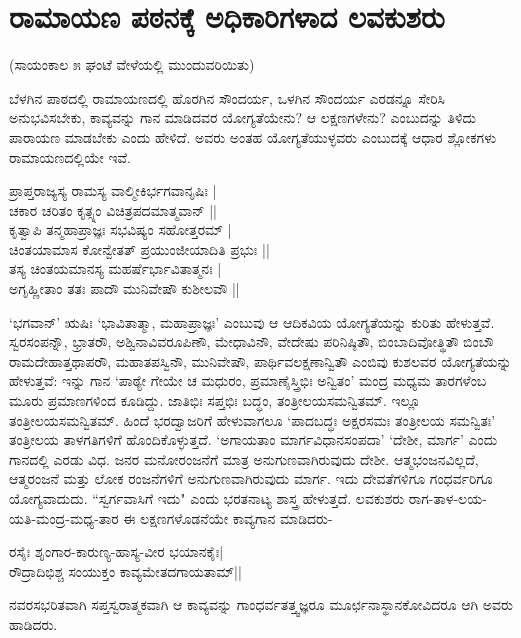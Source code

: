 \section*{ರಾಮಾಯಣ ಪಠನಕ್ಕೆ ಅಧಿಕಾರಿಗಳಾದ ಲವಕುಶರು} 

\begin{center} 
(ಸಾಯಂಕಾಲ ೫ ಘಂಟೆ ವೇಳೆಯಲ್ಲಿ ಮುಂದುವರಿಯಿತು) 
\end{center} 


ಬೆಳಗಿನ ಪಾಠದಲ್ಲಿ ರಾಮಾಯಣದಲ್ಲಿ ಹೊರಗಿನ ಸೌಂದರ್ಯ, ಒಳಗಿನ ಸೌಂದರ್ಯ ಎರಡನ್ನೂ ಸೇರಿಸಿ ಅನುಭವಿಸಬೇಕು, ಕಾವ್ಯವನ್ನು ಗಾನ ಮಾಡಿದವರ ಯೋಗ್ಯತೆಯೇನು? ಆ ಲಕ್ಷಣಗಳೇನು? ಎಂಬುದನ್ನು ತಿಳಿದು ಪಾರಾಯಣ ಮಾಡಬೇಕು ಎಂದು ಹೇಳಿದೆ. ಅವರು ಅಂತಹ ಯೋಗ್ಯತೆಯುಳ್ಳವರು ಎಂಬುದಕ್ಕೆ ಆಧಾರ ಶ್ಲೋಕಗಳು ರಾಮಾಯಣದಲ್ಲಿಯೇ ಇವೆ. 


\begin{shloka}
ಪ್ರಾಪ್ತರಾಜ್ಯಸ್ಯ ರಾಮಸ್ಯ ವಾಲ್ಮೀಕಿರ್ಭಗವಾನೃಷಿಃ |\\ 
ಚಕಾರ ಚರಿತಂ ಕೃತ್ಸ್ನಂ ವಿಚಿತ್ರಪದಮಾತ್ಮವಾನ್‍ ||\\ 
ಕೃತ್ವಾಪಿ ತನ್ಮಹಾಪ್ರಾಜ್ಞಃ ಸಭವಿಷ್ಯಂ ಸಹೋತ್ತರಮ್‍ |\\ 
ಚಿಂತಯಾಮಾಸ ಕೋನ್ವೇತತ್‍ ಪ್ರಯುಂಜೀಯಾದಿತಿ ಪ್ರಭುಃ ||\\ 
ತಸ್ಯ ಚಿಂತಯಮಾನಸ್ಯ ಮಹರ್ಷೆರ್ಭಾವಿತಾತ್ಮನಃ |\\ 
ಅಗೃಹ್ಣೀತಾಂ ತತಃ ಪಾದೌ ಮುನಿವೇಷೌ ಕುಶೀಲವೌ ||
\end{shloka}

`ಭಗವಾನ್‍' ಋಷಿಃ `ಭಾವಿತಾತ್ಮಾ, ಮಹಾಪ್ರಾಜ್ಞಃ' ಎಂಬುವು ಆ ಆದಿಕವಿಯ ಯೋಗ್ಯತೆಯನ್ನು ಕುರಿತು ಹೇಳುತ್ತವೆ. ಸ್ವರಸಂಪನ್ನೌ, ಭ್ರಾತರೌ, ಅಶ್ವಿನಾವಿವರೂಪಿಣೌ, ಮೇಧಾವಿನೌ, ವೇದೇಷು ಪರಿನಿಷ್ಠಿತೌ, ಬಿಂಬಾದಿವೋತ್ಥಿತೌ ಬಿಂಬೌ ರಾಮದೇಹಾತ್ತಥಾಪರೌ, ಮಹಾತಪಸ್ವಿನೌ, ಮುನಿವೇಷೌ, ಪಾರ್ಥಿವಲಕ್ಷಣಾನ್ವಿತೌ ಎಂಬಿವು ಕುಶಲವರ ಯೋಗ್ಯತೆಯನ್ನು ಹೇಳುತ್ತವೆ: ಇನ್ನು ಗಾನ `ಪಾಠ್ಯೇ ಗೇಯೇ ಚ ಮಧುರಂ, ಪ್ರಮಾಣೈಸ್ತ್ರಿಭಿಃ ಅನ್ವಿತಂ' ಮಂದ್ರ ಮಧ್ಯಮ ತಾರಗಳೆಂಬ ಮೂರು ಪ್ರಮಾಣಗಳಿಂದ ಕೂಡಿದ್ದು. ಜಾತಿಭಿಃ ಸಪ್ತಭಿಃ ಬದ್ಧಂ, ತಂತ್ರೀಲಯಸಮನ್ವಿತಮ್‍. ಇಲ್ಲೂ ತಂತ್ರೀಲಯಸಮನ್ವಿತಮ್‍. ಹಿಂದೆ ಭರದ್ವಾಜರಿಗೆ ಹೇಳುವಾಗಲೂ `ಪಾದಬದ್ಧಃ ಅಕ್ಷರಸಮಃ ತಂತ್ರೀಲಯ ಸಮನ್ವಿತಃ' ತಂತ್ರೀಲಯ ತಾಳಗತಿಗಳಿಗೆ ಹೊಂದಿಕೊಳ್ಳುತ್ತದೆ. `ಅಗಾಯತಾಂ ಮಾರ್ಗವಿಧಾನಸಂಪದಾ' `ದೇಶೀ, ಮಾರ್ಗ' ಎಂದು ಗಾನದಲ್ಲಿ ಎರಡು ವಿಧ. ಜನರ ಮನೋರಂಜನೆಗೆ ಮಾತ್ರ ಅನುಗುಣವಾಗಿರುವುದು ದೇಶೀ. ಆತ್ಮಭಂಜನವಿಲ್ಲದೆ, ಆತ್ಮರಂಜನೆ ಮತ್ತು ಲೋಕ ರಂಜನೆಗಳಿಗೆ ಅನುಗುಣವಾಗಿರುವುದು ಮಾರ್ಗ. ಇದು ದೇವತೆಗಳಿಗೂ ಗಂಧರ್ವರಿಗೂ ಯೋಗ್ಯವಾದುದು. ``ಸ್ವರ್ಗವಾಸಿಗೆ ಇದು" ಎಂದು ಭರತನಾಟ್ಯ ಶಾಸ್ತ್ರ ಹೇಳುತ್ತದೆ. ಲವಕುಶರು ರಾಗ-ತಾಳ-ಲಯ-ಯತಿ-ಮಂದ್ರ-ಮಧ್ಯ-ತಾರ ಈ ಲಕ್ಷಣಗಳೊಡನೆಯೇ ಕಾವ್ಯಗಾನ ಮಾಡಿದರು- 

\begin{shloka} 
ರಸೈಃ ಶೃಂಗಾರ-ಕಾರುಣ್ಯ-ಹಾಸ್ಯ-ವೀರ ಭಯಾನಕೈಃ|\\ 
ರೌದ್ರಾದಿಭಿಶ್ಚ ಸಂಯುಕ್ತಂ ಕಾವ್ಯಮೇತದಗಾಯತಾಮ್‍||
\end{shloka}

ನವರಸಭರಿತವಾಗಿ ಸಪ್ತಸ್ವರಾತ್ಮಕವಾಗಿ ಆ ಕಾವ್ಯವನ್ನು ಗಾಂಧರ್ವತತ್ತ್ವಜ್ಞರೂ ಮೂರ್ಛನಾಸ್ಥಾನಕೋವಿದರೂ ಆಗಿ ಅವರು ಹಾಡಿದರು. 


